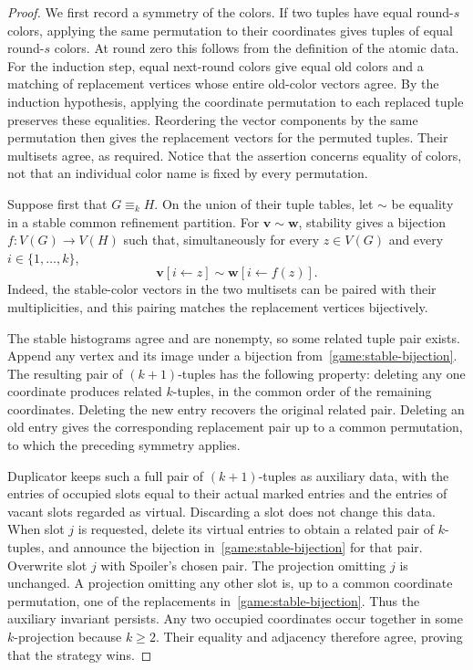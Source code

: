 \begin{proof}
We first record a symmetry of the colors.  If two tuples have equal
round-$s$ colors, applying the same permutation to their coordinates gives
tuples of equal round-$s$ colors.  At round zero this follows from the
definition of the atomic data.  For the induction step, equal next-round
colors give equal old colors and a matching of replacement vertices whose
entire old-color vectors agree.  By the induction hypothesis, applying the
coordinate permutation to each replaced tuple preserves these equalities.
Reordering the vector components by the same permutation then gives the
replacement vectors for the permuted tuples.  Their multisets agree, as
required.  Notice that the assertion concerns equality of colors, not that
an individual color name is fixed by every permutation.

Suppose first that $G\equiv_k H$.  On the union of their tuple tables, let
$\sim$ be equality in a stable common refinement partition.  For
$\mathbf v\sim\mathbf w$, stability gives a bijection
$f:V(G)\to V(H)$ such that, simultaneously for every $z\in V(G)$ and every
$i\in\{1,\ldots,k\}$,
\begin{equation}
\label{game:stable-bijection}
 \mathbf v[i\leftarrow z]\sim\mathbf w[i\leftarrow f(z)].
\end{equation}
Indeed, the stable-color vectors in the two multisets can be paired with
their multiplicities, and this pairing matches the replacement vertices
bijectively.

The stable histograms agree and are nonempty, so some related tuple pair
exists.  Append any vertex and its image under a bijection
from~\eqref{game:stable-bijection}.  The resulting pair of $(k+1)$-tuples
has the following property: deleting any one coordinate produces related
$k$-tuples, in the common order of the remaining coordinates.  Deleting
the new entry recovers the original related pair.  Deleting an old entry
gives the corresponding replacement pair up to a common permutation, to
which the preceding symmetry applies.

Duplicator keeps such a full pair of $(k+1)$-tuples as auxiliary data,
with the entries of occupied slots equal to their actual marked entries
and the entries of vacant slots regarded as virtual.  Discarding a slot
does not change this data.  When slot $j$ is requested, delete its virtual
entries to obtain a related pair of $k$-tuples, and announce the bijection
in~\eqref{game:stable-bijection} for that pair.  Overwrite slot $j$ with
Spoiler's chosen pair.  The projection omitting $j$ is unchanged.  A
projection omitting any other slot is, up to a common coordinate
permutation, one of the replacements in~\eqref{game:stable-bijection}.
Thus the auxiliary invariant persists.  Any two occupied coordinates occur
together in some $k$-projection because $k\geq 2$.  Their equality and
adjacency therefore agree, proving that the strategy wins.


\end{proof}
